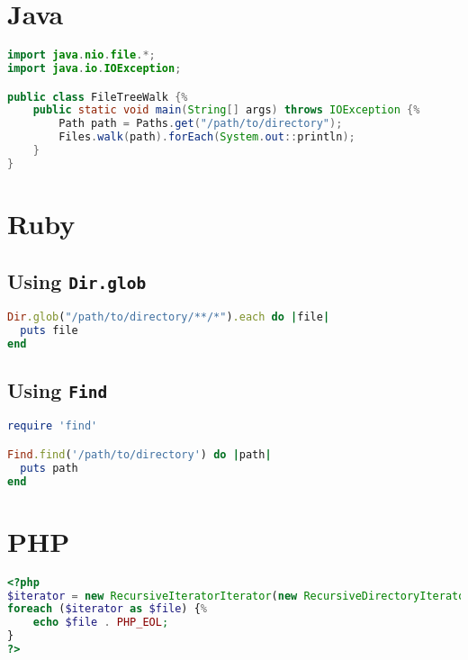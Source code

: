 \documentclass{article}
\begin{document}
\section{Java}
\begin{lstlisting}[language=Java]
import java.nio.file.*;
import java.io.IOException;

public class FileTreeWalk {%
    public static void main(String[] args) throws IOException {%
        Path path = Paths.get("/path/to/directory");
        Files.walk(path).forEach(System.out::println);
    }
}
\end{lstlisting}

\section{Ruby}
\subsection{Using \texttt{Dir.glob}}
\begin{lstlisting}[language=Ruby]
Dir.glob("/path/to/directory/**/*").each do |file|
  puts file
end
\end{lstlisting}

\subsection{Using \texttt{Find}}
\begin{lstlisting}[language=Ruby]
require 'find'

Find.find('/path/to/directory') do |path|
  puts path
end
\end{lstlisting}

\section{PHP}
\begin{lstlisting}[language=PHP]
<?php
$iterator = new RecursiveIteratorIterator(new RecursiveDirectoryIterator('/path/to/directory'));
foreach ($iterator as $file) {%
    echo $file . PHP_EOL;
}
?>
\end{lstlisting}
\end{document}
